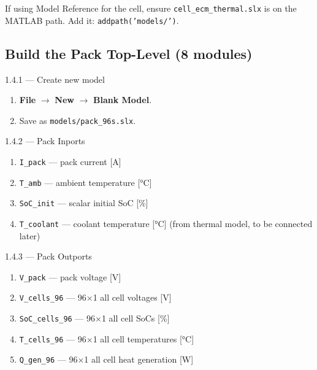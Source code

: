 \documentclass[11pt,a4paper]{article}
\begin{document}
\begin{warnbox}
If using Model Reference for the cell, ensure \texttt{cell\_ecm\_thermal.slx} is on the MATLAB path. Add it: \texttt{addpath('models/')}.
\end{warnbox}

\subsection{Build the Pack Top-Level (8 modules)}

\begin{guistep}{1.4.1 — Create new model}
\begin{enumerate}
    \item \textbf{File} $\to$ \textbf{New} $\to$ \textbf{Blank Model}.
    \item Save as \texttt{models/pack\_96s.slx}.
\end{enumerate}
\end{guistep}

\begin{guistep}{1.4.2 — Pack Inports}
\begin{enumerate}
    \item \texttt{I\_pack} — pack current [A]
    \item \texttt{T\_amb} — ambient temperature [\si{\degreeCelsius}]
    \item \texttt{SoC\_init} — scalar initial SoC [\%]
    \item \texttt{T\_coolant} — coolant temperature [\si{\degreeCelsius}] (from thermal model, to be connected later)
\end{enumerate}
\end{guistep}

\begin{guistep}{1.4.3 — Pack Outports}
\begin{enumerate}
    \item \texttt{V\_pack} — pack voltage [V]
    \item \texttt{V\_cells\_96} — 96$\times$1 all cell voltages [V]
    \item \texttt{SoC\_cells\_96} — 96$\times$1 all cell SoCs [\%]
    \item \texttt{T\_cells\_96} — 96$\times$1 all cell temperatures [\si{\degreeCelsius}]
    \item \texttt{Q\_gen\_96} — 96$\times$1 all cell heat generation [W]
\end{enumerate}
\end{guistep}
\end{document}
